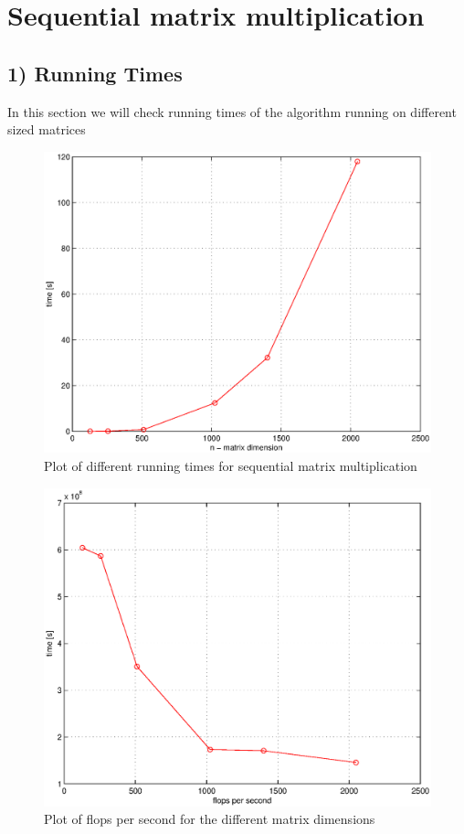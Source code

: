 \section*{Sequential matrix multiplication}


\subsection*{1) Running Times}
In this section we will check running times of the algorithm running on different sized matrices

\begin{figure}[h!] 
 \center 
 \includegraphics[scale=\figurescale]{./figures/plot21.eps}
 \caption{  \label{fig:} Plot of different running times for sequential matrix multiplication}
 \end{figure}

\begin{figure}[h!] 
 \center 
 \includegraphics[scale=\figurescale]{./figures/plot22.eps}
 \caption{  \label{fig:flops} Plot of flops per second for the different matrix dimensions}
 \end{figure}

